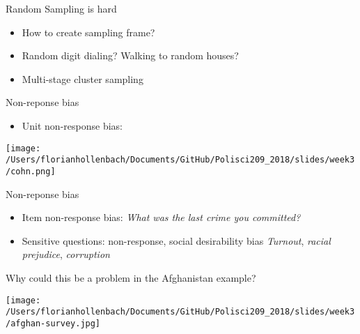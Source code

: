 \documentclass[presentation]{beamer}
\begin{document}
\begin{frame}[label={sec:orgb899d94}]{Random Sampling is hard}
\begin{itemize}
\item How to create sampling frame?

\item Random digit dialing? Walking to random houses?

\item Multi-stage cluster sampling
\end{itemize}
\end{frame}

\begin{frame}[label={sec:orgb6ebd5a}]{Non-reponse bias}
\begin{itemize}
\item Unit non-response bias:
\end{itemize}

\begin{center}
\texttt{[image: /Users/florianhollenbach/Documents/GitHub/Polisci209\_2018/slides/week3/cohn.png]}
\end{center}
\end{frame}




\begin{frame}[label={sec:org5b03ab1}]{Non-reponse bias}
\begin{itemize}
\item Item non-response bias:
\emph{What was the last crime you committed?}
\item Sensitive questions: non-response, social desirability bias
\emph{Turnout}, \emph{racial prejudice}, \emph{corruption}
\end{itemize}
\end{frame}


\begin{frame}[label={sec:org2f26eef}]{Why could this be a problem in the Afghanistan example?}
\begin{center}
\texttt{[image: /Users/florianhollenbach/Documents/GitHub/Polisci209\_2018/slides/week3/afghan-survey.jpg]}
\end{center}
\end{frame}
\end{document}
